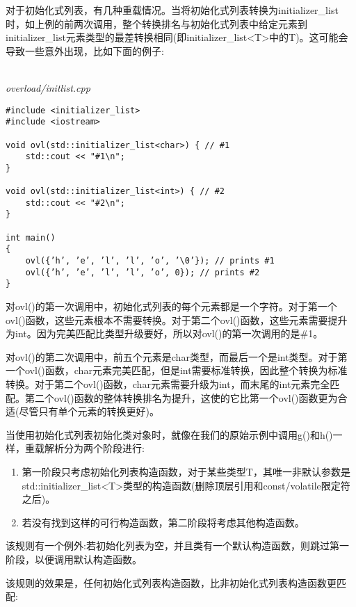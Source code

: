 对于初始化式列表，有几种重载情况。当将初始化式列表转换为initializer\_list时，如上例的前两次调用，整个转换排名与初始化式列表中给定元素到initializer\_list元素类型的最差转换相同(即initializer\_list<T>中的T)。这可能会导致一些意外出现，比如下面的例子:

\hspace*{\fill} \\ %
\noindent
\textit{overload/initlist.cpp}
\begin{lstlisting}[style=styleCXX]
#include <initializer_list>
#include <iostream>

void ovl(std::initializer_list<char>) { // #1
	std::cout << "#1\n";
}

void ovl(std::initializer_list<int>) { // #2
	std::cout << "#2\n";
}

int main()
{
	ovl({’h’, ’e’, ’l’, ’l’, ’o’, ’\0’}); // prints #1
	ovl({’h’, ’e’, ’l’, ’l’, ’o’, 0}); // prints #2
}
\end{lstlisting}

对ovl()的第一次调用中，初始化式列表的每个元素都是一个字符。对于第一个ovl()函数，这些元素根本不需要转换。对于第二个ovl()函数，这些元素需要提升为int。因为完美匹配比类型升级要好，所以对ovl()的第一次调用的是\#1。

对ovl()的第二次调用中，前五个元素是char类型，而最后一个是int类型。对于第一个ovl()函数，char元素完美匹配，但是int需要标准转换，因此整个转换为标准转换。对于第二个ovl()函数，char元素需要升级为int，而末尾的int元素完全匹配。第二个ovl()函数的整体转换排名为提升，这使的它比第一个ovl()函数更为合适(尽管只有单个元素的转换更好)。

当使用初始化式列表初始化类对象时，就像在我们的原始示例中调用g()和h()一样，重载解析分为两个阶段进行:

\begin{enumerate}
\item
第一阶段只考虑初始化列表构造函数，对于某些类型T，其唯一非默认参数是std::initializer\_list<T>类型的构造函数(删除顶层引用和const/volatile限定符之后)。

\item
若没有找到这样的可行构造函数，第二阶段将考虑其他构造函数。
\end{enumerate}

该规则有一个例外:若初始化列表为空，并且类有一个默认构造函数，则跳过第一阶段，以便调用默认构造函数。

该规则的效果是，任何初始化式列表构造函数，比非初始化式列表构造函数更匹配:

